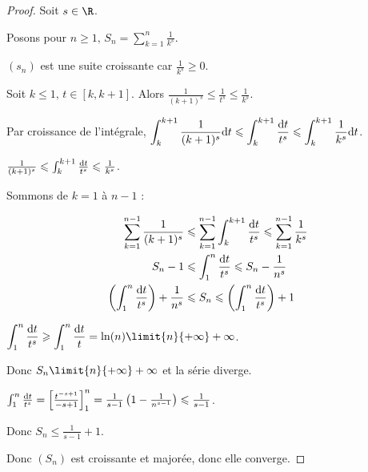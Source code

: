 \begin{proof}
    Soit $s \in \R$. 

    Posons pour $\displaystyle n \geqslant 1, \, S_n = \sum_{k = 1 }^{n} \frac{1}{k^s}$.

    $(s_n)$ est une suite croissante car $\frac 1 {k^s} \geqslant 0$. 

    Soit $k \leqslant 1, \, t \in [k, k+1]$. Alors $\frac 1 {(k + 1)^s} \leqslant \frac 1 {t^s} \leqslant \frac 1 {k^s}$.

    \svspace Par croissance de l'intégrale, $\displaystyle \int_{k }^{k + 1} \frac 1 {(k + 1)^s} \text d t \leqslant \int_{k }^{k + 1} \frac{\text d t}{t^s} \leqslant \int_{k }^{k + 1} \frac 1 {k^s} \text d t$.

    $\frac 1 {(k + 1)^s} \leqslant \int_{k }^{k + 1} \frac{\text d t}{t^s} \leqslant \frac 1 {k^s}$.

    Sommons de $k = 1$ à $n - 1$ : 

    \begin{align*}
        \sum_{k = 1}^{n - 1} \frac 1 {(k + 1)^s} & \leqslant \sum_{k = 1}^{n - 1} \int_{k }^{k + 1} \frac{\text d t}{t^s} \leqslant \sum_{k = 1}^{n - 1} \frac 1 {k^s} \\
        S_n - 1 & \leqslant \int_{1 }^{n } \frac{\text d t}{t^s} \leqslant S_n  - \frac 1 {n^s} \\
        \left( \int_{1}^{n } \frac{\text d t}{t^s} \right) + \frac 1 {n^s} & \leqslant S_n \leqslant \left( \int_{1 }^{n } \frac{\text d t}{t^s} \right) + 1
    \end{align*}


    \avspace $\displaystyle \int_{1 }^{n} \frac{\text d t}{t^s}  \geqslant \int_{1 }^{n } \frac{\text d t}{t} = \ln(n) \limit{n}{+ \infty} +\infty$.

    Donc $S_n \limit{n}{+ \infty} +\infty$ et la série diverge. 


    \svspace $\int_{1 }^{n} \frac{\text d t}{t^s}  = \left[ \frac{t^{-s + 1}}{-s + 1} \right]_{1}^{n} = \frac 1 {s - 1} \left( 1 - \frac 1 {n^{s - 1}} \right) \leqslant \frac 1 {s - 1}$.

    Donc $S_n \leqslant \frac 1 {s - 1} + 1$.

    Donc $(S_n)$ est croissante et majorée, donc elle converge.

\end{proof}

